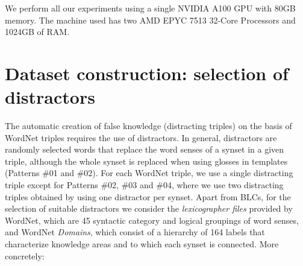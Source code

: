 \documentclass[11pt]{article}
\newcommand{\WORDNET}{WordNet}
\begin{document}
We perform all our experiments using a single NVIDIA A100 GPU with 80GB memory. The machine used has two AMD EPYC 7513 32-Core Processors and 1024GB of RAM.




\section{Dataset construction: selection of distractors} \label{section:DatasetConstruction}
\begin{table}[tb]
\centering

\caption{Truth-value of resulting sentences by pattern.}
\label{tab:TruthValues}
\end{table} The automatic creation of false knowledge (distracting triples) on the basis of \WORDNET{} triples requires the use of distractors. In general, distractors are randomly selected words that replace the word senses of a synset in a given triple, although the whole synset is replaced when using glosses in templates (Patterns \#01 and \#02). For each \WORDNET{} triple, we use a single distracting triple except for Patterns \#02, \#03 and \#04, where we use two distracting triples obtained by using one distractor per synset. Apart from BLCs, for the selection of suitable distractors we consider the {\it lexicographer files} provided by \WORDNET{}, which are 45 syntactic category and logical groupings of word senses, and \WORDNET{} {\it Domains}, which consist of a hierarchy of 164 labels that characterize knowledge areas and to which each synset is connected. More concretely:
\end{document}
